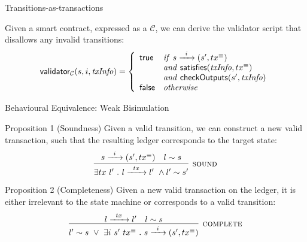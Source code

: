 \begin{frame}{Transitions-as-transactions}

Given a smart contract, expressed as a \CEM{} $\mathcal{C}$,
we can derive the validator script that disallows any invalid transitions:
\[
\mathsf{validator}_\mathcal{C}(s, i, \mathit{txInfo}) = \left\{
  \begin{array}{lll}
  \textsf{true}  & \mathit{if} \  s \xrightarrow{\hspace{5pt} i \hspace{5pt}} (s' , tx^\equiv)  \\
         & \mathit{and} \ \mathsf{satisfies}(\mathit{txInfo}, tx^\equiv) \\
         & \mathit{and} \ \mathsf{checkOutputs}(s', \mathit{txInfo}) \\
  \textsf{false} & \mathit{otherwise}
  \end{array}
\right.
\]

\end{frame}

\begin{frame}{Behavioural Equivalence: Weak Bisimulation}

\begin{alertblock}{Proposition 1 (Soundness)}
Given a valid \CEM{} transition, we can construct a new valid transaction,
such that the resulting ledger corresponds to the target \CEM{} state:
\[
\infer[\textsc{sound}]
  {\exists tx\ l'\ .\ \LStep{l}{tx}\ \wedge \Sim{l'}{s'}}
  {%
    \CStep{s}{i}{\txeq}
  & \Sim{l}{s}
  }
\]
\end{alertblock}

\vfill

\begin{alertblock}{Proposition 2 (Completeness)}
Given a new valid transaction on the ledger, it is either irrelevant to the state machine
or corresponds to a valid \CEM{} transition:
\[
\infer[\textsc{complete}]
  { \Sim{l'}{s}\ \vee\ \exists i\ s'\ \txeq\ .\ \CStep{s}{i}{\txeq} }
  { \LStep{l}{tx}
  & \Sim{l}{s}
  }
\]
\end{alertblock}

\end{frame}
